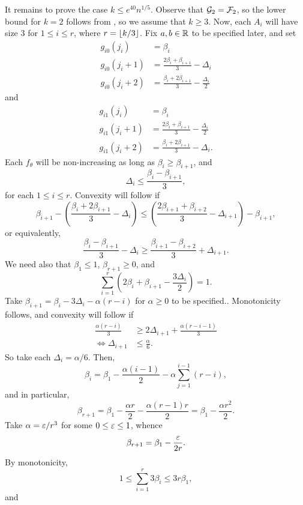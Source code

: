 It remains to prove the case $k \le e^{40} n^{1/5}$. Observe that
$\mathcal{G}_2 = \mathcal{F}_2$, so the lower bound for $k = 2$ follows from
, so we assume that $k \ge 3$. Now, each $A_i$
will have size $3$ for $1 \le i \le r$, where $r = {\lfloor k/3 \rfloor}$. Fix
$a, b \in \mathbb{R}$ to be specified later, and set
\begin{align*}
  g_{i0}(j_i) &= \beta_i  \\
  g_{i0}(j_i + 1) &= \frac{2 \beta_i + \beta_{i + 1}}{3} - \Delta_i \\
  g_{i0}(j_i + 2) &= \frac{\beta_i + 2 \beta_{i + 1}}{3} - \frac{\Delta_i}{2}
\end{align*}
and
\begin{align*}
  g_{i1}(j_i) &= \beta_i \\
  g_{i1}(j_i + 1) &= \frac{2 \beta_i + \beta_{i + 1}}{3} - \frac{\Delta_i}{2}  \\
  g_{i1}(j_i + 2) &= \frac{\beta_i + 2 \beta_{i + 1}}{3} - \Delta_i .
\end{align*}
Each $f_\theta$ will be non-increasing as long as
$\beta_i \ge \beta_{i + 1}$, and
\[
  \Delta_i \le \frac{\beta_i - \beta_{i + 1}}{3} ,
\]
for each $1 \le i \le r$. Convexity will follow if
\[
  \beta_{i + 1} - \left( \frac{\beta_i + 2 \beta_{i + 1}}{3} - \Delta_i \right) \le \left( \frac{2 \beta_{i + 1} + \beta_{i + 2}}{3} - \Delta_{i + 1}\right) - \beta_{i + 1} ,
\]
or equivalently,
\[
  \frac{\beta_{i} - \beta_{i + 1}}{3} - \Delta_i \ge \frac{\beta_{i + 1} - \beta_{i + 2}}{3} + \Delta_{i + 1} .
\]
We need also that $\beta_1 \le 1$, $\beta_{r + 1} \ge 0$, and
\[
  \sum_{i = 1}^r \left(2 \beta_i + \beta_{i + 1} - \frac{3 \Delta_i}{2}\right) = 1 .
\]
Take $\beta_{i + 1} = \beta_i - 3 \Delta_i - \alpha (r - i)$ for
$\alpha \ge 0$ to be specified.. Monotonicity follows, and convexity
will follow if
\begin{align*}
  \frac{\alpha (r - i)}{3}  &\ge 2 \Delta_{i + 1} + \frac{\alpha (r - i - 1)}{3} \\
  \iff  \Delta_{i + 1} &\le \frac{\alpha}{6} .
\end{align*}
So take each $\Delta_i = \alpha/6$. Then,
\[
  \beta_i = \beta_1 - \frac{\alpha (i - 1)}{2} -  \alpha \sum_{j = 1}^{i - 1} (r - i ) ,
\]
and in particular,
\[
  \beta_{r + 1} = \beta_1 - \frac{\alpha r}{2} - \frac{\alpha (r - 1) r}{2} = \beta_1 - \frac{\alpha r^2}{2} .
\]
Take $\alpha = \varepsilon/r^3$ for some $0 \le \varepsilon \le 1$, whence
\[
  \beta_{r + 1} = \beta_1 - \frac{\varepsilon}{2r} .
\]
By monotonicity,
\[
  1 \le \sum_{i = 1}^r 3\beta_i \le 3 r \beta_1 ,
\]
and
